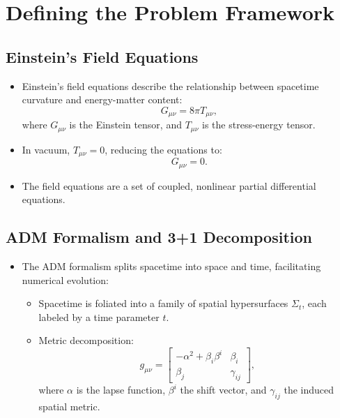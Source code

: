 \documentclass[12pt]{article}
\begin{document}
\section{Defining the Problem Framework}

\subsection{Einstein's Field Equations}
\begin{itemize}
    \item Einstein's field equations describe the relationship between spacetime curvature and energy-matter content:
    \begin{equation}
        G_{\mu\nu} = 8\pi T_{\mu\nu},
    \end{equation}
    where $G_{\mu\nu}$ is the Einstein tensor, and $T_{\mu\nu}$ is the stress-energy tensor.
    \item In vacuum, $T_{\mu\nu} = 0$, reducing the equations to:
    \begin{equation}
        G_{\mu\nu} = 0.
    \end{equation}
    \item The field equations are a set of coupled, nonlinear partial differential equations.
\end{itemize}

\subsection{ADM Formalism and 3+1 Decomposition}

\begin{itemize}
    \item The ADM formalism splits spacetime into space and time, facilitating numerical evolution:
    \begin{itemize}
        \item Spacetime is foliated into a family of spatial hypersurfaces $\Sigma_t$, each labeled by a time parameter $t$.
        \item Metric decomposition:
        \begin{equation}
            g_{\mu\nu} = 
            \begin{bmatrix}
                -\alpha^2 + \beta_i \beta^i & \beta_i \\
                \beta_j & \gamma_{ij}
            \end{bmatrix},
        \end{equation}
        where $\alpha$ is the lapse function, $\beta^i$ the shift vector, and $\gamma_{ij}$ the induced spatial metric.
    \end{itemize}
\end{itemize}
\end{document}
